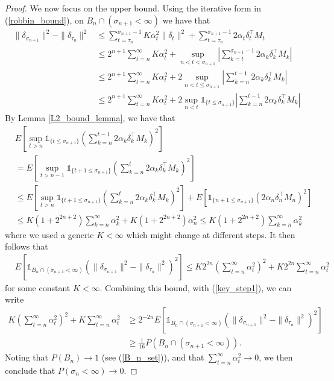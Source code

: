 \documentclass[11pt]{article}
\begin{document}
\begin{proof}
We now focus on the upper bound. Using the iterative form in (\ref{robbin_bound}), on $B_n\cap (\sigma_{n+1}<\infty)$ we have that 
\begin{align*}
\|\delta_{\sigma_{n+1}}\|^2 - \|\delta_{\tau_n}\|^2& \leq \sum_{t=\tau_n}^{\sigma_{n+1}-1} K \alpha_t^2 \|\delta_t\|^2 + \sum_{t=\tau_n}^{\sigma_{n+1}-1}  2\alpha_t\delta_t^\intercal M_t\\
&\leq 2^{n+1}\sum_{t=n}^{\infty} K \alpha_t^2 + \sup_{n<t<\sigma_{n+1}} \left| \sum_{k=t}^{\sigma_{n+1}-1} 2\alpha_k\delta_k^\intercal M_k\right|\\
&\leq  2^{n+1}\sum_{t=n}^{\infty} K \alpha_t^2 + 2\sup_{n<t\leq \sigma_{n+1}}  \left|\sum_{k=n}^{t-1} 2\alpha_k\delta_k^\intercal M_k\right|\\
&\leq  2^{n+1}\sum_{t=n}^{\infty} K \alpha_t^2 + 2\sup_{n<t} \mathds{1}_{\{t\leq \sigma_{n+1}\}}  \left| \sum_{k=n}^{t-1}2\alpha_k\delta_k^\intercal M_k\right|
\end{align*}
By Lemma \ref{L2_bound_lemma}, we have that 
\begin{align*}
&E\left[\sup_{t>n} \mathds{1}_{\{t \leq \sigma_{n+1}\}}\left(\sum_{k=n}^{t-1} 2\alpha_k \delta_k^\intercal M_k\right)^2  \right] \\
& = E\left[\sup_{t>n-1} \mathds{1}_{\{t+1 \leq \sigma_{n+1}\}}\left(\sum_{k=n}^{t} 2\alpha_k \delta_k^\intercal M_k\right)^2  \right] \\
&\leq E\left[\sup_{t>n} \mathds{1}_{\{t+1 \leq \sigma_{n+1}\}}\left(\sum_{k=n}^{t} 2\alpha_k \delta_k^\intercal M_k\right)^2  \right] +  E\left[ \mathds{1}_{\{n+1 \leq \sigma_{n+1}\}}\left( 2\alpha_n \delta_n^\intercal M_n\right)^2  \right] \\
&\leq K (1+2^{2n+2}) \sum_{k=n}^{\infty} \alpha_k^2 + K (1+2^{2n+2}) \alpha_n^2\leq  K (1+2^{2n+2}) \sum_{k=n}^{\infty} \alpha_k^2 
\end{align*}
where we used a generic $K<\infty$ which might change at different steps.
It then follows that 
\begin{align*}
&E\left[\mathds{1}_{B_n\cap(\sigma_{n+1}<\infty)} (\|\delta_{\sigma_{n+1}}\|^2 - \|\delta_{\tau_n}\|^2)^2 \right] \leq K 2^{2n} \left(\sum_{t=n}^{\infty}  \alpha_t^2 \right)^2+K 2^{2n} \sum_{t=n}^{\infty}  \alpha_t^2 
\end{align*}
for some constant $K<\infty$. Combining this bound, with (\ref{key_step1}), we can write
\begin{align*}
K \left(\sum_{t=n}^{\infty}  \alpha_t^2 \right)^2 + K\sum_{t=n}^{\infty}  \alpha_t^2& \geq 2^{-2n}E\left[\mathds{1}_{B_n\cap(\sigma_{n+1}<\infty)} (\|\delta_{\sigma_{n+1}}\|^2 - \|\delta_{\tau_n}\|^2)^2 \right]\\
& \geq \frac{1}{16} P(B_n\cap(\sigma_{n+1}<\infty)).
\end{align*}
Noting that $P(B_n)\to 1$ (see (\ref{B_n_set})), and that $ \sum_{t=n}^{\infty}  \alpha_t^2 \to 0$, we then conclude that 
$
P(\sigma_{n}<\infty)\to 0.
$
\end{proof}





\end{document}
